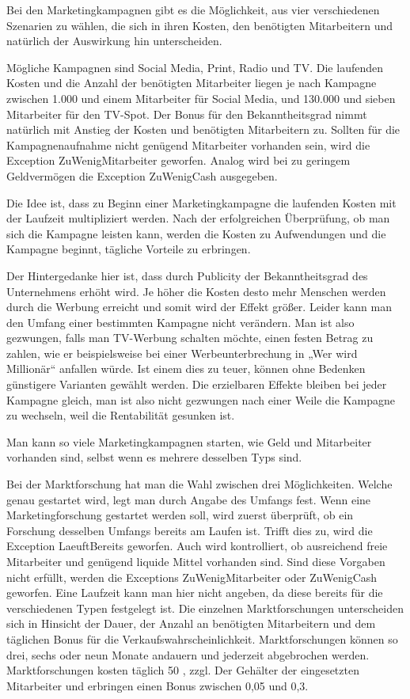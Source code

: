 Bei den Marketingkampagnen gibt es die Möglichkeit, aus vier verschiedenen Szenarien zu wählen, die sich in ihren Kosten, den benötigten Mitarbeitern und natürlich der Auswirkung hin unterscheiden.

Mögliche Kampagnen sind Social Media, Print, Radio und TV. Die laufenden Kosten und die Anzahl der benötigten Mitarbeiter liegen je nach Kampagne zwischen 1.000 \€ und einem Mitarbeiter für Social Media, und 130.000 \€ und sieben Mitarbeiter für den TV-Spot. Der Bonus für den Bekanntheitsgrad nimmt natürlich mit Anstieg der Kosten und benötigten Mitarbeitern zu.
Sollten für die Kampagnenaufnahme nicht genügend Mitarbeiter vorhanden sein, wird die Exception ZuWenigMitarbeiter geworfen. Analog wird bei zu geringem Geldvermögen die Exception ZuWenigCash ausgegeben.

Die Idee ist, dass zu Beginn einer Marketingkampagne die laufenden Kosten mit der Laufzeit multipliziert werden. Nach der erfolgreichen Überprüfung, ob man sich die Kampagne leisten kann, werden die Kosten zu Aufwendungen und die Kampagne beginnt, tägliche Vorteile zu erbringen.

Der Hintergedanke hier ist, dass durch Publicity der Bekanntheitsgrad des Unternehmens erhöht wird. Je höher die Kosten desto mehr Menschen werden durch die Werbung erreicht und somit wird der Effekt größer. Leider kann man den Umfang einer bestimmten Kampagne nicht verändern. Man ist also gezwungen, falls man TV-Werbung schalten möchte, einen festen Betrag zu zahlen, wie er beispielsweise bei einer Werbeunterbrechung in „Wer wird Millionär“ anfallen würde.
Ist einem dies zu teuer, können ohne Bedenken günstigere Varianten gewählt werden. Die erzielbaren Effekte bleiben bei jeder Kampagne gleich, man ist also nicht gezwungen nach einer Weile die Kampagne zu wechseln, weil die Rentabilität gesunken ist.

Man kann so viele Marketingkampagnen starten, wie Geld und Mitarbeiter vorhanden sind, selbst wenn es mehrere desselben Typs sind.

Bei der Marktforschung hat man die Wahl zwischen drei Möglichkeiten. Welche genau gestartet wird, legt man durch Angabe des Umfangs fest. Wenn eine Marketingforschung gestartet werden soll, wird zuerst überprüft, ob ein Forschung desselben Umfangs bereits am Laufen ist. Trifft dies zu, wird die Exception LaeuftBereits geworfen. Auch wird kontrolliert, ob ausreichend freie Mitarbeiter und genügend liquide Mittel vorhanden sind. Sind diese Vorgaben nicht erfüllt, werden die Exceptions ZuWenigMitarbeiter oder ZuWenigCash geworfen. Eine Laufzeit kann man hier nicht angeben, da diese bereits für die verschiedenen Typen festgelegt ist.
Die einzelnen Marktforschungen unterscheiden sich in Hinsicht der Dauer, der Anzahl an benötigten Mitarbeitern und dem täglichen Bonus für die Verkaufswahrscheinlichkeit. Marktforschungen können so drei, sechs oder neun Monate andauern und jederzeit abgebrochen werden. Marktforschungen kosten täglich 50 \€, zzgl. Der Gehälter der eingesetzten Mitarbeiter und erbringen einen Bonus zwischen 0,05 und 0,3.

